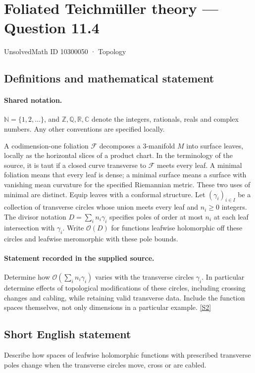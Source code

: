 \documentclass[11pt]{article}
\newcommand{\sref}[2]{\hyperlink{source:#1:#2}{[S#2]}}
\begin{document}
\setcounter{section}{10300049}
\section{Foliated Teichmüller theory — Question 11.4}\label{10300050}
{\small\sffamily UnsolvedMath ID 10300050 · Topology}
\subsection{Definitions and mathematical statement}

\paragraph{Shared notation.}$\mathbb N=\{1,2,\ldots\}$, and $\mathbb Z,\mathbb Q,\mathbb R,\mathbb C$ denote the integers, rationals, reals and complex numbers. Any other conventions are specified locally.


A codimension-one foliation $\mathcal F$ decomposes a $3$-manifold $M$ into surface leaves, locally as the horizontal slices of a product chart. In the terminology of the source, it is taut if a closed curve transverse to $\mathcal F$ meets every leaf. A minimal foliation means that every leaf is dense; a minimal surface means a surface with vanishing mean curvature for the specified Riemannian metric. These two uses of minimal are distinct. Equip leaves with a conformal structure. Let $(\gamma_i)_{i\in I}$ be a collection of transverse circles whose union meets every leaf and $n_i\ge0$ integers. The divisor notation $D=\sum_i n_i\gamma_i$ specifies poles of order at most $n_i$ at each leaf intersection with $\gamma_i$. Write $\mathscr O(D)$ for functions leafwise holomorphic off these circles and leafwise meromorphic with these pole bounds.
\paragraph{Statement recorded in the supplied source.}
Determine how $\mathscr O(\sum_i n_i\gamma_i)$ varies with the transverse circles $\gamma_i$. In particular determine effects of topological modifications of these circles, including crossing changes and cabling, while retaining valid transverse data. Include the function spaces themselves, not only dimensions in a particular example. \sref{10300050}{2}
\subsection{Short English statement}
Describe how spaces of leafwise holomorphic functions with prescribed transverse poles change when the transverse circles move, cross or are cabled.
\end{document}
